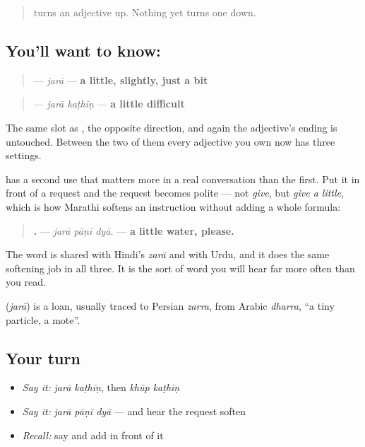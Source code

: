 \label{lesson:MR-C53-jara}



\begin{quote}
\textbf{} turns an adjective up. Nothing yet turns one down.
\end{quote}

\subsection*{You'll want to know: }
\begin{quote}
\textbf{} — \emph{jarā} — \textbf{a little, slightly, just a bit}
\end{quote}

\begin{quote}
\textbf{ } — \emph{jarā kaṭhīṇ} — \textbf{a little difficult}
\end{quote}

The same slot as \textbf{}, the opposite direction, and again the adjective's ending is untouched. Between the two of them every adjective you own now has three settings.

\textbf{} has a second use that matters more in a real conversation than the first. Put it in front of a request and the request becomes polite — not \emph{give}, but \emph{give a little}, which is how Marathi softens an instruction without adding a whole formula:

\begin{quote}
\textbf{  .} — \emph{jarā pāṇī dyā.} — \textbf{a little water, please.}
\end{quote}

The word is shared with Hindi's \emph{zarā} and with Urdu, and it does the same softening job in all three. It is the sort of word you will hear far more often than you read.

\begin{cousinweb}
\textbf{} (\emph{jarā}) is a loan, usually traced to Persian \emph{zarra}, from Arabic \emph{dharra}, \textquotedblleft{}a tiny particle, a mote\textquotedblright{}.
\end{cousinweb}

\subsection*{Your turn}
\begin{itemize}
\raggedright
  \item \emph{Say it:} \emph{jarā kaṭhīṇ}, then \emph{khūp kaṭhīṇ}
  \item \emph{Say it:} \emph{jarā pāṇī dyā} — and hear the request soften
  \item \emph{Recall:} say \textbf{ } and add \textbf{} in front of it
\end{itemize}

